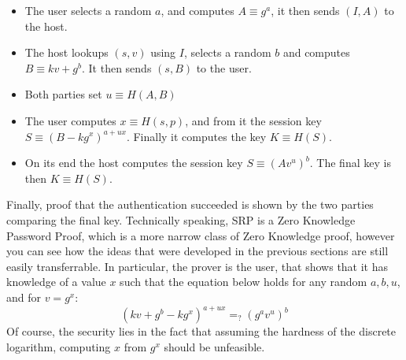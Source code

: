 \documentclass{article}
\begin{document}
\begin{itemize}
    \item The user selects a random $a$, and computes $A \equiv g^a$, it then sends $(I, A)$ to the host.
    \item The host lookups $(s,v)$ using $I$, selects a random $b$ and computes $B \equiv kv + g^b$. It then sends $(s, B)$ to the user.
    \item Both parties set $u \equiv H(A, B)$
    \item The user computes $x \equiv H(s, p)$, and from it the session key $S \equiv (B - kg^x)^{a + ux}$. Finally it computes the key
          $K \equiv H(S)$. 
    \item On its end the host computes the session key $S \equiv (Av^u)^b$. The final key is then $K \equiv H(S)$.
\end{itemize}
Finally, proof that the authentication succeeded is shown by the two parties comparing the final key.
Technically speaking, SRP is a Zero Knowledge Password Proof, which is a more narrow class of Zero Knowledge proof,
however you can see how the ideas that were developed in the previous sections are still easily transferrable.
In particular, the prover is the user, that shows that it has knowledge of a value $x$ such that the equation 
below holds for any random $a, b, u$, and for $v = g^x$:
\[ (kv + g^b - kg^x)^{a + ux} =_? (g^a v^u)^b \]
Of course, the security lies in the fact that assuming the hardness of the discrete logarithm, computing 
$x$ from $g^x$ should be unfeasible.
\end{document}
